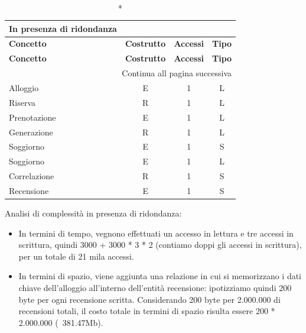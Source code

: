 \small
\setlength\extrarowheight{2pt}
\begin{longtable}{|lccc|}
    \caption*{In presenza di ridondanza}                                             \\

    \hline \textbf{Concetto} & \textbf{Costrutto} & \textbf{Accessi} & \textbf{Tipo} \\\hline
    \endfirsthead

    \hline \textbf{Concetto} & \textbf{Costrutto} & \textbf{Accessi} & \textbf{Tipo} \\\hline
    \endhead

    \hline \multicolumn{4}{|r|}{{Continua all pagina successiva}}                    \\\hline
    \endfoot

    \hline
    \endlastfoot
    Alloggio                 & E                  & 1                & L             \\%
    Riserva                  & R                  & 1                & L             \\%
    Prenotazione             & E                  & 1                & L             \\%
    Generazione              & R                  & 1                & L             \\%
    Soggiorno                & E                  & 1                & S             \\%
    Soggiorno                & E                  & 1                & L             \\%
    Correlazione             & R                  & 1                & S             \\%
    Recensione               & E                  & 1                & S             \\%
\end{longtable}
\normalsize


% 
% 
% 
%

Analisi di complessità in presenza di ridondanza:
\begin{itemize}
    \item In termini di tempo, vegnono effettuati un accesso in lettura e tre accessi in scrittura, quindi 3000 + 3000 * 3 * 2 (contiamo doppi gli accessi in scrittura), per un totale di 21 mila accessi.
    \item In termini di spazio, viene aggiunta una relazione in cui si memorizzano i dati chiave dell'alloggio all'interno dell'entità recensione: ipotizziamo quindi 200 byte per ogni recensione scritta.
          Considerando 200 byte per 2.000.000 di recensioni totali, il costo totale in termini di spazio risulta essere 200 * 2.000.000 (~381.47Mb).
\end{itemize}

